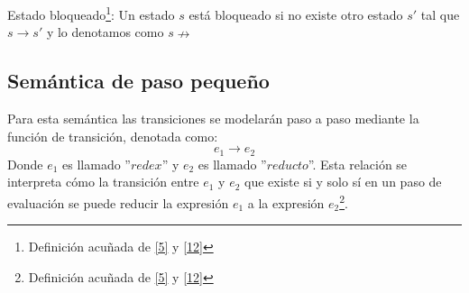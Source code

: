     \begin{definition}Estado bloqueado\footnote{Definición acuñada de \hyperlink{5}{[5]} y  \hyperlink{12}{[12]} }: Un estado $s$ está bloqueado si no existe otro estado $s'$ tal que $s \rightarrow s'$ y lo denotamos como $s \nrightarrow$
    \end{definition}


    \subsection{Semántica de paso pequeño}
        Para esta semántica las transiciones se modelarán paso a paso mediante la función de transición, denotada como: 
	$$e_1 \rightarrow e_2$$ 
	Donde $e_1$ es llamado ''$redex$'' y $e_2$ es llamado ''$reducto$''. Esta relación se interpreta cómo la transición entre $e_1$ y $e_2$ que existe si y solo sí en un paso de evaluación se puede reducir la expresión $e_1$ a la expresión $e_2$\footnote{Definición acuñada de \hyperlink{5}{[5]} y  \hyperlink{12}{[12]} }.


